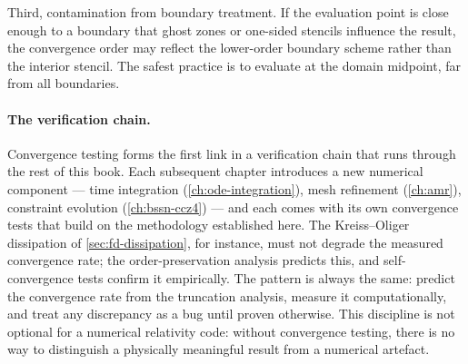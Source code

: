 Third, contamination from boundary treatment.  If the evaluation point is
close enough to a boundary that ghost zones or one-sided stencils
influence the result, the convergence order may reflect the lower-order
boundary scheme rather than the interior stencil.  The safest practice is
to evaluate at the domain midpoint, far from all boundaries.

\paragraph{The verification chain.}

Convergence testing forms the first link in a verification chain that
runs through the rest of this book.  Each subsequent chapter introduces a
new numerical component --- time integration
(\cref{ch:ode-integration}), mesh refinement (\cref{ch:amr}), constraint
evolution (\cref{ch:bssn-ccz4}) --- and each comes with its own
convergence tests that build on the methodology established here.  The
Kreiss--Oliger dissipation of \cref{sec:fd-dissipation}, for instance,
must not degrade the measured convergence rate; the order-preservation
analysis predicts this, and self-convergence tests confirm it
empirically.  The pattern is always the same: predict the convergence
rate from the truncation analysis, measure it computationally, and treat
any discrepancy as a bug until proven otherwise.  This discipline is not
optional for a numerical relativity code: without convergence testing,
there is no way to distinguish a physically meaningful result from a
numerical artefact.
